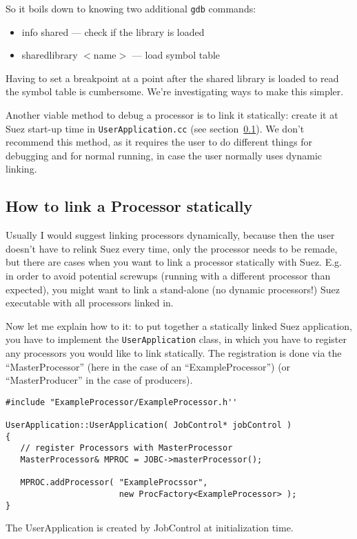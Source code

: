 \documentclass[12pt]{article}
\begin{document}
So it boils down to knowing two additional \texttt{gdb} commands:
%
\begin{itemize}
\item info shared                 --- check if the library is loaded
\item sharedlibrary $<$name$>$    --- load symbol table
\end{itemize}

Having to set a breakpoint at a point after the shared library is loaded
to read the symbol table is cumbersome. We're investigating ways to make
this simpler.

Another viable method to debug a processor is to link it statically:
create it at Suez start-up time in \texttt{UserApplication.cc} (see
section~\ref{sec:UserApplication}). We don't recommend this method, as
it requires the user to do different things for debugging and for normal
running, in case the user normally uses dynamic linking.


\subsection{How to link a Processor statically
}
\label{sec:UserApplication}

Usually I would suggest linking processors dynamically, because then the
user doesn't have to relink Suez every time, only the processor needs to
be remade, but there are cases when you want to link a processor
statically with Suez.
E.g. in order to avoid potential screwups (running with a different
processor than expected), you might want to link a stand-alone (no
dynamic processors!) Suez executable with all processors linked in.

Now let me explain how to it: to put together a
statically linked Suez application, you have to implement the
\texttt{UserApplication} class, in which you have to register any
processors you would like to link statically. The registration is done
via the ``MasterProcessor'' (here in the case of an
``ExampleProcessor'') (or ``MasterProducer'' in the case of producers).
%
\begin{verbatim}
#include "ExampleProcessor/ExampleProcessor.h''

UserApplication::UserApplication( JobControl* jobControl )
{
   // register Processors with MasterProcessor
   MasterProcessor& MPROC = JOBC->masterProcessor();

   MPROC.addProcessor( "ExampleProcssor",
                       new ProcFactory<ExampleProcessor> );
}
\end{verbatim}
%
The UserApplication is created by JobControl at initialization time.
\medskip
\end{document}
